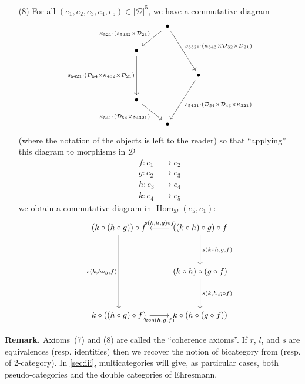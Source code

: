 \documentclass[fleqn]{article}
\newenvironment{rmenv}[1]
  {\phantomsection\par\medskip\noindent\textbf{#1.}\rmfamily}
  {\par\medskip}
\newcommand{\oldpage}[1]{\marginpar{\footnotesize$\Big\vert$ \textit{p.~#1}}}
\newcommand{\cat}[1]{\mathcal{#1}}
\newcommand{\set}[1]{|#1|}
\DeclareMathOperator{\Hom}{Hom}
\begin{document}
\begin{enumerate}
  \item[(8)]
    For all $(e_1,e_2,e_3,e_4,e_5)\in\set{\cat{D}}^5$, we have a commutative diagram
    \[
      \begin{tikzcd}
      & \bullet
          \ar[dl,swap,"\kappa_{521}\cdot(s_{5432}\times\cat{D}_{21})"]
          \ar[ddr,"s_{5321}\cdot(\kappa_{543}\times\cat{D}_{32}\times\cat{D}_{21})"]
      \\\bullet
          \ar[dd,swap,"s_{5421}\cdot(\cat{D}_{54}\times\kappa_{432}\times\cat{D}_{21})"]
      \\
      &&\bullet
          \ar[ddl,"s_{5431}\cdot(\cat{D}_{54}\times\cat{D}_{43}\times\kappa_{321})"]
      \\\bullet
          \ar[dr,swap,"\kappa_{541}\cdot(\cat{D}_{54}\times s_{4321})"]
      \\
      & \bullet
      \end{tikzcd}
    \]
    (where the notation of the objects is left to the reader) so that ``applying'' this diagram to morphisms in $\cat{D}$
    \[
      \begin{aligned}
        f\colon e_1
      & \to e_2
      \\g\colon e_2
      & \to e_3
      \\h\colon e_3
      & \to e_4
      \\k\colon e_4
      & \to e_5
      \end{aligned}
    \]
     we obtain a commutative diagram in $\Hom_\cat{D}(e_5,e_1)$:
     \[
       \begin{tikzcd}[row sep=huge]
          (k\circ(h\circ g))\circ f
            \ar[dd,swap,"{s(k,h\circ g,f)}"]
        & ((k\circ h)\circ g)\circ f
            \ar[l,swap,"{s(k,h,g)\circ f}"]
            \ar[d,"{s(k\circ h,g,f)}"]
        \\
        & (k\circ h)\circ(g\circ f)
            \ar[d,"{s(k,h,g\circ f)}"]
        \\k\circ((h\circ g)\circ f)
            \ar[r,swap,"{k\circ s(h,g,f)}"]
        & k\circ(h\circ(g\circ f))
       \end{tikzcd}
     \]
\end{enumerate}

\begin{rmenv}{Remark}
  \oldpage{246}
  Axioms~(7) and (8) are called the ``coherence axioms''.
  If $r$, $l$, and $s$ are equivalences (resp. identities) then we recover the notion of bicategory from \cite{Be} (resp. of 2-category).
  In \cref{sec:iii}, multicategories will give, as particular cases, both pseudo-categories and the double categories of Ehresmann.
\end{rmenv}
\end{document}
